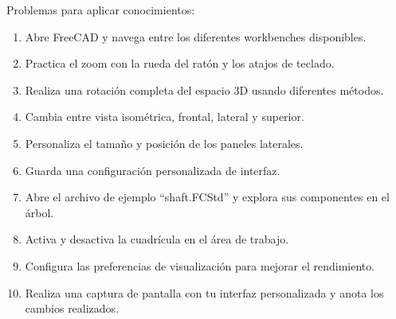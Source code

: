 Problemas para aplicar conocimientos:
\begin{enumerate}
	\item Abre FreeCAD y navega entre los diferentes
	      workbenches disponibles.
	\item Practica el zoom con la rueda del ratón y los
	      atajos de teclado.
	\item Realiza una rotación completa del espacio 3D
	      usando diferentes métodos.
	\item Cambia entre vista isométrica, frontal, lateral
	      y superior.
	\item Personaliza el tamaño y posición de los paneles
	      laterales.
	\item Guarda una configuración personalizada de
	      interfaz.
	\item Abre el archivo de ejemplo ``shaft.FCStd'' y
	      explora sus componentes en el árbol.
	\item Activa y desactiva la cuadrícula en el área de
	      trabajo.
	\item Configura las preferencias de visualización para
	      mejorar el rendimiento.
	\item Realiza una captura de pantalla con tu interfaz
	      personalizada y anota los cambios realizados.
\end{enumerate}